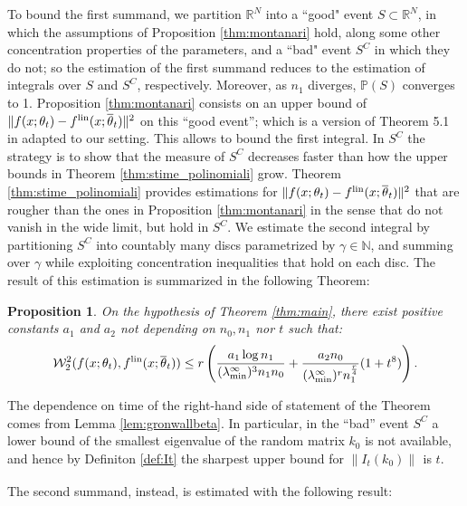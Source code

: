 \documentclass{article}
\newtheorem{prop}[thm]{Proposition}
\theoremstyle{definition}
\theoremstyle{remark}
\numberwithin{equation}{section}
\newcommand{\R}{\mathbb{R}}
\newcommand{\N}{\mathbb{N}}
\newcommand{\lin}{{\textup{lin}}}
\newcommand{\lammin}{\lambda_{\textup{min}}}
\newcommand{\norm}[2]{
    \|#1\|_{#2}
}
\begin{document}
To bound the first summand, we partition $\R^N$ into a ``good" event $S \subset \R^N$, in which the assumptions of Proposition \ref{thm:montanari} hold, along some other concentration properties of the parameters,
and a ``bad" event $S^C$ in which they do not; so the estimation of the first summand reduces to the estimation of integrals over $S$ and $S^C$, respectively.
Moreover, as $n_1$ diverges, $\mathbb P(S)$ converges to 1.
Proposition \ref{thm:montanari} consists on an upper bound of $\norm{f(x;\theta_t)-f^\lin(x;\overline \theta_t)}{}^2$ on this ``good event''; which is a version of Theorem 5.1 in \cite{Bartlett_Montanari_Rakhlin_2021} adapted to our setting.
This allows to bound the first integral.
In $S^C$ the strategy is to show that the measure of $S^C$ decreases faster than how the upper bounds in Theorem \ref{thm:stime_polinomiali} grow.
Theorem \ref{thm:stime_polinomiali} provides estimations for $\norm{f(x;\theta_t)-f^\lin(x;\overline \theta_t)}{}^2$ that are rougher than the ones in Proposition \ref{thm:montanari} in the sense that do not vanish in the wide limit, but hold in $S^C$.
We estimate the second integral by partitioning $S^C$ into countably many discs parametrized by $\gamma \in \N$, and summing over $\gamma$ while exploiting concentration inequalities that hold on each disc.
The result of this estimation is summarized in the following Theorem:

\begin{prop}
    \label{quasi_main}
    On the hypothesis of Theorem \ref{thm:main}, there exist positive constants $a_1$ and $a_2$ not depending on $n_0,n_1$ nor $t$ such that:
    \[
        \mathcal W_2^2(f(x;\theta_t),f^\lin(x;\overline \theta_t)) \le r\left(\frac{a_1\log n_1}{(\lammin^\infty)^3n_1n_0}+\frac{a_2  n_0}{(\lammin^\infty)^rn_1^\frac{r}{4}}(1+t^8)\right).
    \]
\end{prop}

The dependence on time of the right-hand side of statement of the Theorem comes from Lemma \ref{lem:gronwallbeta}.
In particular, in the ``bad'' event $S^C$ a lower bound of the smallest eigenvalue of the random matrix $k_0$ is not available, 
and hence by Definiton \ref{def:It} the sharpest upper bound for $\norm{I_t(k_0)}{}$ is $t$.

The second summand, instead, is estimated with the following result:
\end{document}
